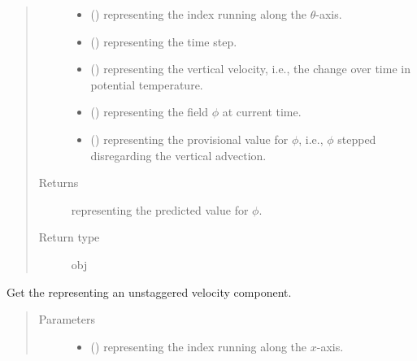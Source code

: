\documentclass[letterpaper,10pt,english]{sphinxmanual}
\begin{document}
\begin{fulllineitems}
\begin{fulllineitems}
\begin{quote}
\begin{description}
\begin{itemize}
\item {} 
 () \textendash{}  representing the index running along the \(\theta\)-axis.

\item {} 
 () \textendash{}  representing the time step.

\item {} 
 () \textendash{}  representing the vertical velocity, i.e., the change over time in potential temperature.

\item {} 
 () \textendash{}  representing the field \(\phi\) at current time.

\item {} 
 () \textendash{}  representing the provisional value for \(\phi\), i.e., \(\phi\) stepped
disregarding the vertical advection.

\end{itemize}

\item[{Returns}] \leavevmode
{} representing the predicted value for \(\phi\).

\item[{Return type}] \leavevmode
obj

\end{description}\end{quote}

\end{fulllineitems}


\begin{fulllineitems}
\label{\detokenize{api:dycore.flux_isentropic_maccormack.FluxIsentropicMacCormack._get_velocity}}
Get the  representing an unstaggered velocity component.
\begin{quote}\begin{description}
\item[{Parameters}] \leavevmode\begin{itemize}
\item {} 
 () \textendash{}  representing the index running along the \(x\)-axis.


\end{itemize}
\end{description}
\end{quote}
\end{fulllineitems}
\end{fulllineitems}
\end{document}
